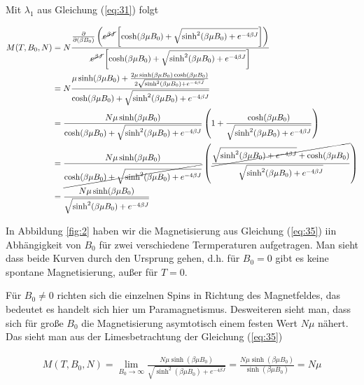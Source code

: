 Mit \(\lambda_1\) aus Gleichung (\ref{eq:31}) folgt

\begin{align}
  \label{eq:35}
  M(T,B_0,N) &= N\frac{ \pdiff_{(\beta B_0)}\left( \cancel{e^{\beta J}}\left[\cosh(\beta \mu B_0) + \sqrt{\sinh^2(\beta \mu B_0) + e^{-4\beta J}   } \right] \right) } 
{\cancel{e^{\beta J}}\left[\cosh(\beta \mu B_0) + \sqrt{\sinh^2(\beta \mu B_0) + e^{-4\beta J}   } \right] } \notag\\
&= N \frac{ \mu \sinh(\beta \mu B_0) + \frac{2\mu\sinh(\beta \mu B_0)\cosh(\beta \mu B_0) }{2 \sqrt{\sinh^2(\beta \mu B_0) + e^{-4\beta J}   }}  } 
{\cosh(\beta \mu B_0) + \sqrt{\sinh^2(\beta \mu B_0) + e^{-4\beta J}   }  } \notag\\
&=\frac{ N \mu \sinh(\beta \mu B_0)}{ \cosh(\beta \mu B_0) + \sqrt{\sinh^2(\beta \mu B_0) + e^{-4\beta J}   }  } \left( 1  + \frac{\cosh(\beta \mu B_0) }{\sqrt{\sinh^2(\beta \mu B_0) + e^{-4\beta J}   }}  \right) \notag\\
&=\frac{ N \mu \sinh(\beta \mu B_0)}{ \cancel{\cosh(\beta \mu B_0) + \sqrt{\sinh^2(\beta \mu B_0) + e^{-4\beta J}   } } } \left( \frac{\cancel{\sqrt{\sinh^2(\beta \mu B_0) + e^{-4\beta J}   }+\cosh(\beta \mu B_0)} }{\sqrt{\sinh^2(\beta \mu B_0) + e^{-4\beta J}   }}   \right) \notag\\
&=\frac{ N \mu \sinh(\beta \mu B_0)}{\sqrt{\sinh^2(\beta \mu B_0) + e^{-4\beta J}   }}
\end{align}

In Abbildung \ref{fig:2} haben wir die Magnetisierung aus Gleichung (\ref{eq:35}) iin Abhängigkeit von \(B_0\) für zwei verschiedene Termperaturen aufgetragen. Man sieht dass beide Kurven durch den Ursprung gehen, d.h. für \(B_0=0\) gibt es keine spontane Magnetisierung, außer für \(T=0\). 

Für \(B_0\ne 0\) richten sich die einzelnen Spins in Richtung des Magnetfeldes, das bedeutet es handelt sich hier um Paramagnetismus. Desweiteren sieht man, dass sich für große \(B_0\) die Magnetisierung asymtotisch einem festen Wert \(N\mu\)  nähert. Das sieht man aus der Limesbetrachtung der Gleichung (\ref{eq:35})

\begin{align}
  \label{eq:36}
  M(T,B_0,N) = \lim_{B_0\to\infty} \frac{ N \mu \sinh(\beta \mu B_0)}{\sqrt{\sinh^2(\beta \mu B_0) + e^{-4\beta J}   }} = \frac{ N \mu \sinh(\beta \mu B_0)}{\sinh(\beta \mu B_0)} = N\mu
\end{align}

